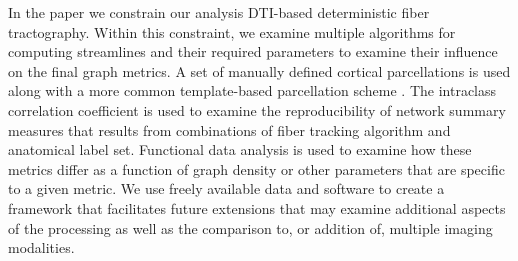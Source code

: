 \documentclass{frontiersSCNS} %
\begin{document}
In the paper we constrain our
analysis DTI-based deterministic fiber
tractography. Within this constraint, we examine multiple algorithms
for computing streamlines and their required parameters to examine
their influence on the final graph metrics. A set of manually defined
cortical parcellations \citep{Klein2012} is used along with a more common template-based
parcellation scheme \citep{AAL}. The intraclass correlation coefficient is used to 
examine the reproducibility of network summary measures that results from combinations
of fiber tracking algorithm and anatomical label set. Functional data analysis is used
to examine how these metrics differ as a function of graph density or other parameters
that are specific to a given metric. We use freely
available data and software to create a framework that facilitates future extensions
that may examine additional aspects of the processing as well as the
comparison to, or addition of, multiple imaging modalities. 



\end{document}
